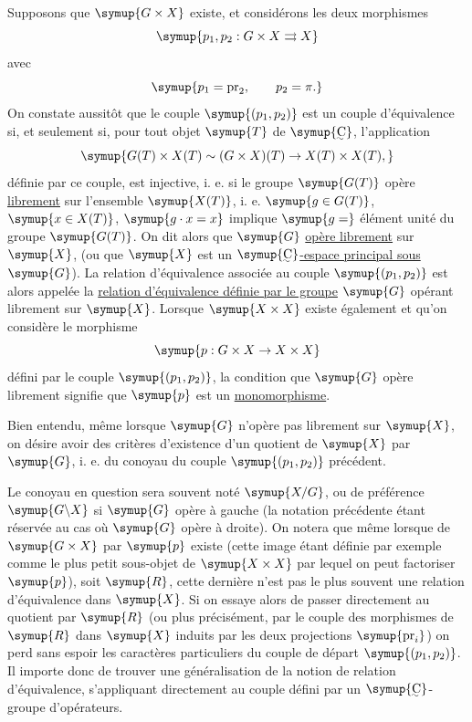 Supposons que $\symup{G\times X}$ existe, et considérons les deux morphismes
\[
  \symup{p_1,p_2:G\times X\rightrightarrows X}
\]
avec
\[
  \symup{p_1=\operatorname{pr}_2,\qquad p_2=\pi.}
\]
On constate aussitôt que le couple $\symup{(p_1,p_2)}$ est un couple d'équivalence si,
et seulement si, pour tout objet $\symup{T}$ de $\symup{\text{\uwave{C}}}$, l'application
\[
  \symup{G(T)\times X(T)\sim(G\times X)(T)
  \to X(T)\times X(T),}
\]
définie par ce couple, est injective, i. e. si le groupe $\symup{G(T)}$ opère
\uline{librement} sur l'ensemble $\symup{X(T)}$, i. e. $\symup{g\in G(T)}$, $\symup{x\in X(T)}$,
$\symup{g\cdot x=x}$ implique $\symup{g=}$ élément unité du groupe $\symup{G(T)}$. On dit
alors que $\symup{G}$ \uline{opère librement} sur $\symup{X}$, (ou que $\symup{X}$ est un
$\symup{\text{\uwave{C}}}$\uline{-espace principal sous} $\symup{G}$). La relation d'équivalence
associée au couple $\symup{(p_1,p_2)}$ est alors appelée la \uline{relation
d'équivalence définie par le groupe} $\symup{G}$ opérant librement sur $\symup{X}$. Lorsque
$\symup{X\times X}$ existe également et qu'on considère le morphisme
\[
  \symup{p:G\times X\to X\times X}
\]
défini par le couple $\symup{(p_1,p_2)}$, la condition que $\symup{G}$ opère librement signifie
que $\symup{p}$ est un \uline{monomorphisme}.

Bien entendu, même lorsque $\symup{G}$ n'opère pas librement sur $\symup{X}$, on désire avoir
des critères d'existence d'un quotient de $\symup{X}$ par $\symup{G}$, i. e. du conoyau du
couple $\symup{(p_1,p_2)}$ précédent.

Le conoyau en question sera souvent noté $\symup{X/G}$, ou de préférence $\symup{G\backslash
X}$ si $\symup{G}$ opère à gauche (la notation précédente étant réservée au cas où $\symup{G}$
opère à droite). On notera que même lorsque  de $\symup{G\times X}$ par $\symup{p}$
existe (cette image étant définie par exemple comme le plus petit sous-objet de
$\symup{X\times X}$ par lequel on peut factoriser $\symup{p}$), soit $\symup{R}$, cette dernière n'est
pas le plus souvent une relation d'équivalence dans $\symup{X}$. Si on essaye alors de
passer directement au quotient par $\symup{R}$ (ou plus précisément, par le couple des
morphismes de $\symup{R}$ dans $\symup{X}$ induits par les deux projections
$\symup{\operatorname{pr}_i}$) on perd sans espoir les caractères particuliers du
couple de départ $\symup{(p_1,p_2)}$. Il importe donc de trouver une généralisation de
la notion de relation d'équivalence, s'appliquant directement au couple défini
par un $\symup{\text{\uwave{C}}}$-groupe d'opérateurs.

